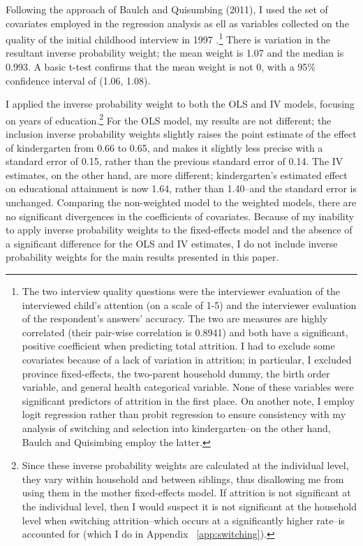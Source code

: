 Following the approach of Baulch and Quisumbing (2011), I used the set of covariates employed in the regression analysis as ell as variables collected on the quality of the initial childhood interview in 1997 \citep{Baulch2011}.\footnote{The two interview quality questions were the interviewer evaluation of the interviewed child's attention (on a scale of 1-5) and the interviewer evaluation of the respondent's answers' accuracy. The two are measures are highly correlated (their pair-wise correlation is 0.8941) and both have a significant, positive coefficient when predicting total attrition. I had to exclude some covariates because of a lack of variation in attrition; in particular, I excluded province fixed-effects, the two-parent household dummy, the birth order variable, and general health categorical variable. None of these variables were significant predictors of attrition in the first place. On another note, I employ logit regression rather than probit regression to ensure consistency with my analysis of switching and selection into kindergarten--on the other hand, Baulch and Quisimbing employ the latter.} There is variation in the resultant inverse probability weight; the mean weight is 1.07 and the median is 0.993. A basic t-test confirms that the mean weight is not 0, with a 95\% confidence interval of (1.06, 1.08).

I applied the inverse probability weight to both the OLS and IV models, focusing on years of education.\footnote{Since these inverse probability weights are calculated at the individual level, they vary within household and between siblings, thus disallowing me from using them in the mother fixed-effects model. If attrition is not significant at the individual level, then I would suspect it is not significant at the household level when switching attrition--which occurs at a significantly higher rate--is accounted for (which I do in Appendix ~\ref{app:switching}).} For the OLS model, my results are not different; the inclusion inverse probability weights slightly raises the point estimate of the effect of kindergarten from 0.66 to 0.65, and makes it slightly less precise with a standard error of 0.15, rather than the previous standard error of 0.14. The IV estimates, on the other hand, are more different; kindergarten's estimated effect on educational attainment is now 1.64, rather than 1.40--and the standard error is unchanged. Comparing the non-weighted model to the weighted models, there are no significant divergences in the coefficients of covariates. Because of my inability to apply inverse probability weights to the fixed-effects model and the absence of a significant difference for the OLS and IV estimates, I do not include inverse probability weights for the main results presented in this paper.


